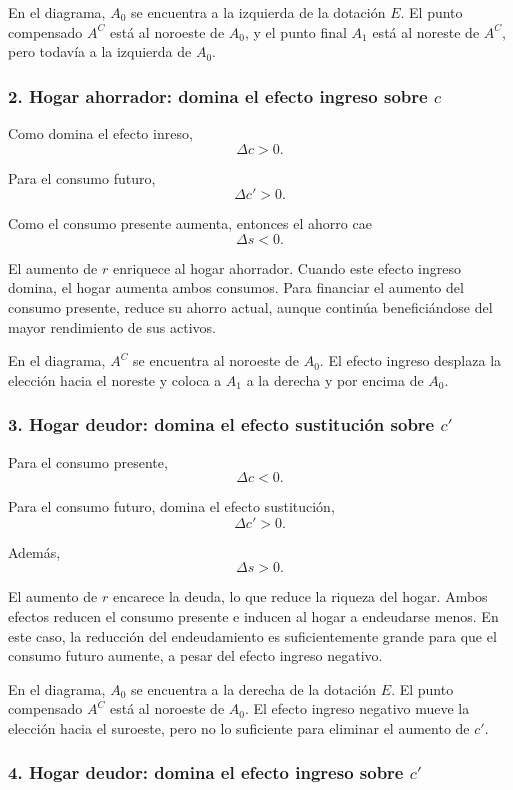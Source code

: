 \documentclass[11pt]{article}
\begin{document}
En el diagrama, \(A_0\) se encuentra a la izquierda de la dotación \(E\). El punto compensado \(A^C\) está al noroeste de \(A_0\), y el punto final \(A_1\) está al noreste de \(A^C\), pero todavía a la izquierda de \(A_0\).

\subsubsection*{2. Hogar ahorrador: domina el efecto ingreso sobre \(c\)}

Como domina el efecto inreso,
\[
  \boxed{\Delta c>0}.
\]

Para el consumo futuro,
\[
  \boxed{\Delta c'>0}.
\]

Como el consumo presente aumenta, entonces el ahorro cae
\[
  \boxed{\Delta s<0}.
\]

El aumento de \(r\) enriquece al hogar ahorrador. Cuando este efecto ingreso domina, el hogar aumenta ambos consumos. Para financiar el aumento del consumo presente, reduce su ahorro actual, aunque continúa beneficiándose del mayor rendimiento de sus activos.

En el diagrama, \(A^C\) se encuentra al noroeste de \(A_0\). El efecto ingreso desplaza la elección hacia el noreste y coloca a \(A_1\) a la derecha y por encima de \(A_0\).

\subsubsection*{3. Hogar deudor: domina el efecto sustitución sobre \(c'\)}

Para el consumo presente,
\[
  \boxed{\Delta c<0}.
\]

Para el consumo futuro, domina el efecto sustitución,
\[
  \boxed{\Delta c'>0}.
\]

Además,
\[
  \boxed{\Delta s>0}.
\]

El aumento de \(r\) encarece la deuda, lo que reduce la riqueza del hogar. Ambos efectos reducen el consumo presente e inducen al hogar a endeudarse menos. En este caso, la reducción del endeudamiento es suficientemente grande para que el consumo futuro aumente, a pesar del efecto ingreso negativo.

En el diagrama, \(A_0\) se encuentra a la derecha de la dotación \(E\). El punto compensado \(A^C\) está al noroeste de \(A_0\). El efecto ingreso negativo mueve la elección hacia el suroeste, pero no lo suficiente para eliminar el aumento de \(c'\).

\subsubsection*{4. Hogar deudor: domina el efecto ingreso sobre \(c'\)}
\end{document}
